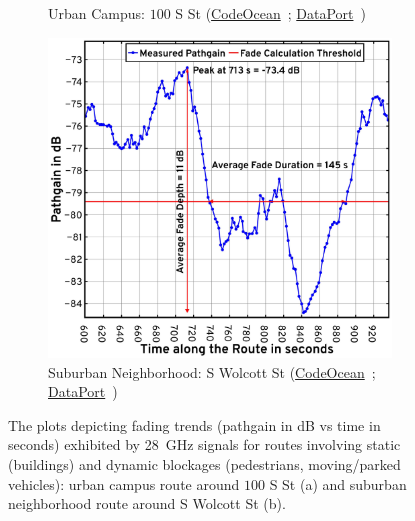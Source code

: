 \documentclass[10pt, twocolumn]{IEEEtran}
\begin{document}
{\begin{figure} [t]
\begin{subfigure}{0.5\linewidth}
        \caption{Urban Campus: $100$ S St (\href{https://codeocean.com/capsule/9545863/tree}{CodeOcean}~\cite{CodeOcean}; \href{http://ieee-dataport.org/12580}{DataPort}~\cite{DataPort})}
        \label{F10a}
    \end{subfigure}
    \begin{subfigure}{0.49\linewidth}
        \centering
        \includegraphics[width=0.95\linewidth]{figs/suburban_pathgain_vs_time_annotated.pdf}
        \caption{Suburban Neighborhood: S Wolcott St (\href{https://codeocean.com/capsule/9545863/tree}{CodeOcean}~\cite{CodeOcean}; \href{http://ieee-dataport.org/12580}{DataPort}~\cite{DataPort})}
        \label{F10b}
    \end{subfigure}
    \vspace{-5mm}
    \caption{The plots depicting fading trends (pathgain in dB vs time in seconds) exhibited by \SI{28}{\giga\hertz} signals for routes involving static (buildings) and dynamic blockages (pedestrians, moving/parked vehicles): urban campus route around $100$ S St (a) and suburban neighborhood route around S Wolcott St (b).}
    \vspace{-4.093mm}
    \label{F10}
\end{figure}
}
\end{document}

